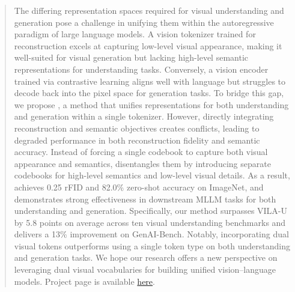 \begin{abstract}

The differing representation spaces required for visual understanding and generation pose a challenge in unifying them within the autoregressive paradigm of large language models. A vision tokenizer trained for reconstruction excels at capturing low-level visual appearance, making it well-suited for visual generation but lacking high-level semantic representations for understanding tasks. Conversely, a vision encoder trained via contrastive learning aligns well with language but struggles to decode back into the pixel space for generation tasks.
To bridge this gap, we propose \textbf{\ours}, a method that unifies representations for both understanding and generation within a single tokenizer.
However, directly integrating reconstruction and semantic objectives creates conflicts, leading to degraded performance in both reconstruction fidelity and semantic accuracy.
Instead of forcing a single codebook to capture both visual appearance and semantics, \ours{} disentangles them by introducing separate codebooks for high-level semantics and low-level visual details.
As a result, \ours{} achieves 0.25 rFID and 82.0\% zero-shot accuracy on ImageNet, and demonstrates strong effectiveness in downstream MLLM tasks for both understanding and generation.
Specifically, our method surpasses VILA-U by 5.8 points on average across ten visual understanding benchmarks and delivers a 13\% improvement on GenAI-Bench.
Notably, incorporating dual visual tokens outperforms using a single token type on both understanding and generation tasks.
We hope our research offers a new perspective on leveraging dual visual vocabularies for building unified vision–language models.
Project page is available \href{https://songweii.github.io/dualtoken-project-page/}{here}.

\end{abstract}
